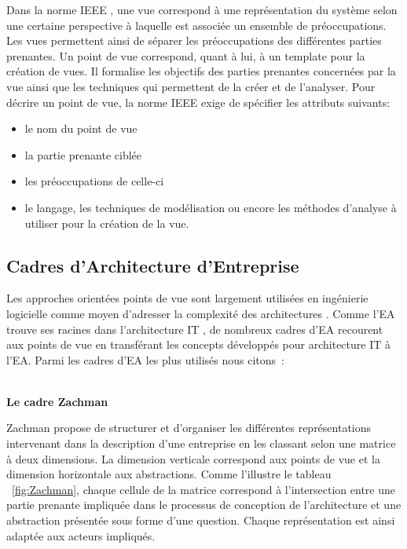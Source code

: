 Dans la norme IEEE \cite{hilliard2000ieee}, une vue correspond à une représentation du système selon une certaine perspective à laquelle est associée un ensemble de préoccupations. Les vues permettent ainsi de séparer les préoccupations des différentes parties prenantes. Un point de vue correspond, quant à lui, à un template pour la création de 
vues. Il formalise les objectifs des parties prenantes concernées par la vue 
ainsi que les techniques qui permettent de la créer et de l'analyser. Pour 
décrire un point de vue, la norme IEEE \cite{hilliard2000ieee} exige de spécifier les attributs suivants:
\begin{itemize}
\item le nom du point de vue
\item la partie prenante ciblée
\item les préoccupations de celle-ci
\item le langage, les techniques de modélisation ou encore les méthodes 
d'analyse à utiliser pour la création de la vue. 
\end{itemize}

	\subsection{Cadres d'Architecture d'Entreprise}

Les approches orientées points de vue sont largement utilisées en ingénierie logicielle comme moyen d'adresser la complexité des architectures \cite{steen2004supporting}. Comme l'EA trouve ses racines dans l'architecture IT \cite{winter2008enterprise}, de nombreux cadres d'EA recourent aux points de vue en transférant les concepts développés pour architecture IT à l'EA. Parmi les cadres d'EA les plus utilisés nous citons~:
\\\

\textbf{Le cadre Zachman}

Zachman \cite{zachman1987framework} propose de structurer et d'organiser les différentes représentations intervenant dans la description d'une entreprise en les classant selon une matrice à deux dimensions. La dimension verticale correspond aux points de vue et la dimension horizontale aux abstractions. Comme l'illustre le tableau ~\ref{fig:Zachman}, chaque cellule de la matrice correspond à l'intersection entre une partie prenante impliquée dans le processus de conception de l'architecture et une abstraction présentée sous forme d'une question. Chaque représentation est ainsi adaptée aux acteurs impliqués. 

